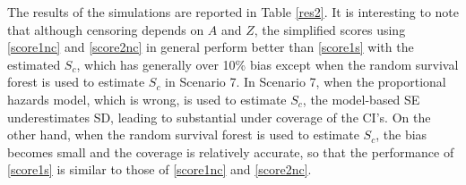 \documentclass[11pt]{article}
\begin{document}




The results of the simulations are reported in Table \ref{res2}. 
It is interesting  to note that although censoring depends on $A$ and $Z$, 
 the simplified scores using \eqref{score1nc} and \eqref{score2nc} in general perform better than \eqref{score1s} with the estimated $S_c$, which has generally over 10\% bias except when the random survival forest is used to estimate $S_c$ in Scenario 7. 
In Scenario 7,  when  the  proportional hazards  model, which is wrong, is used to estimate $S_c$,   the model-based SE underestimates SD, leading to substantial under  coverage  of the CI's. On the other hand, when the random survival forest is used to estimate $S_c$, the bias becomes small and the coverage is relatively accurate, so that the performance of  \eqref{score1s} is similar to those of \eqref{score1nc} and \eqref{score2nc}.

\end{document}
